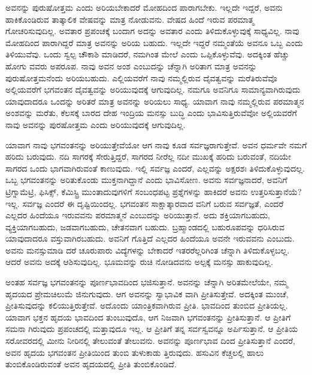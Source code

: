 ಅವನನ್ನು ಪುರುಷೋತ್ತಮ ಎಂದು ಅರಿಯಬೇಕಾದರೆ ಮೋಹದಿಂದ ಪಾರಾಗಬೇಕು. ಇಲ್ಲದೇ ಇದ್ದರೆ, ಅವನು ಹಾಕಿಕೊಂಡಿರುವ ತಾತ್ಕಾಲಿಕ ವೇಷವನ್ನು ಮಾತ್ರ ನೋಡುವನು. ವೇಷದ ಹಿಂದೆ ಇರುವ ಪರಮಾತ್ಮ ಗೋಚರಿಸುವುದಿಲ್ಲ. ಅವತಾರ ಪ್ರಪಂಚಕ್ಕೆ ಬಂದಾಗ ಅದನ್ನು ಅವತಾರ ಎಂದು ತಿಳಿದುಕೊಳ್ಳುವುಕ್ಕೆ ಸಾಧ್ಯವಿಲ್ಲ. ನಾವು ಮೋಹದಿಂದ ಪಾರಾಗಿದ್ದರೆ ಮಾತ್ರ ಅವನನ್ನು ಅರಿಯ ಬಹುದು. ಇಲ್ಲದೇ ಇದ್ದರೆ ನಮ್ಮಂತೆಯೆ ಅವನೂ ಒಬ್ಬ ಎಂದು ತಿಳಿಯುವೆವು. ಒಂದು ಸ್ವಲ್ಪ ಚೌಕಾಶಿ ಮಾಡಿದರೆ, ನಮಗಿಂತ ಮೇಲೆ ಎಂದು ಒಪ್ಪಿಕೊಳ್ಳುವೆವು. ಅದಕ್ಕಿಂತ ಹೆಚ್ಚು ಹೋಗು ವವರು ಅಪರೂಪ. ನಾವು ಅವನ ಅಂಶ ಎಂಬುದನ್ನು ಚೆನ್ನಾಗಿ ಅರಿತಾಗ ಮಾತ್ರ ಅವನನ್ನು ಪುರುಷೋತ್ತಮನೆಂದು ಅರಿಯಬಹುದು. ಎಲ್ಲಿಯವರೆಗೆ ನಾವು ನಮ್ಮಲ್ಲಿರುವ ದೈವತ್ವವನ್ನು ಮರೆತಿರುವೆವೊ ಅಲ್ಲಿಯವರೆಗೆ ಭಗವಂತನ ದೈವತ್ವವನ್ನು ಅರಿಯುವುದಕ್ಕೆ ಆಗುವುದಿಲ್ಲ. ನಮಗೂ ಅವನಿಗೂ ಸಾಮಾನ್ಯವಾಗಿರುವುದು ಯಾವುದಾದರೂ ಒಂದನ್ನು ಅರಿತರೆ ಮಾತ್ರ ಅವನನ್ನು ಅರಿಯಲು ಸಾಧ್ಯ. ಯಾವಾಗ ನಾವು ನಮ್ಮಲ್ಲಿರುವ ಪರಮಾತ್ಮನ ಅಂಶವನ್ನು ಮರೆತು, ಕೆಲಸಕ್ಕೆ ಬಾರದ ದೇಹ ಇಂದ್ರಿಯ ಮನಸ್ಸು ಬುದ್ಧಿ ಎಂದು ಭಾವಿಸುತ್ತಿರುವೆವೋ ಅಲ್ಲಿಯವರೆಗೆ ನಾವು ಅವನನ್ನು ಪುರಷೋತ್ತಮ ಎಂದು ಅರಿಯುವುದಕ್ಕೆ ಆಗುವುದಿಲ್ಲ.

ಯಾವಾಗ ನಾವು ಭಗವಂತನನ್ನು ಅರಿಯುತ್ತೇವೆಯೋ ಆಗ ನಾವು ಕೂಡ ಸರ್ವಜ್ಞರಾಗುತ್ತೇವೆ. ಅವನ ಧರ್ಮವೇ ನಮಗೆ ಹರಿದು ಬರುವುದು. ನದಿ ಸಾಗರಕ್ಕೆ ಸೇರುತ್ತಿದ್ದರೆ, ಸಾಗರದ ನೀರೆಲ್ಲ ನದೀ ಮುಖಕ್ಕೆ ಹರಿದು ಬರುವಂತೆ, ನದಿಯೇ ಸಾಗರದ ಒಂದು ಭಾಗವಾಗಿರುವಂತೆ ಕಾಣುವುದು. ಇಲ್ಲಿ ಸರ್ವಜ್ಞ ಎಂದರೆ, ಎಲ್ಲವನ್ನು ಅಕ್ಷರಶಃ ತಿಳಿದುಕೊಳ್ಳುವುದಲ್ಲ. ಒಬ್ಬ ಭಗವಂತನನ್ನು ಅರಿತುಕೊಂಡು ಮುಕ್ತನಾಗಿದ್ದಾನೆ ಎಂದು ಭಾವಿಸೋಣ. ಅವನು ಸರ್ವಜ್ಞನಾದರೆ, ಅವನಿಗೆ ಟ್ರಿಗ್ನಾಮೆಟ್ರಿ, ಫಿಸಿಕ್ಸ್, ಕೆಮಿಸ್ಟ್ರಿ ಮುಂತಾದುವುಗಳಿಗೆ ಸಂಬಂಧಪಟ್ಟ ಪ್ರಶ್ನೆಗಳನ್ನು ಹಾಕಿದರೆ ಅವನು ಉತ್ತರಿಸುತ್ತಾನೆಯೆ? ಇಲ್ಲ. ಸರ್ವಜ್ಞ ಎಂದರೆ ಈ ದೃಷ್ಟಿಯಿಂದಲ್ಲ. ಭಗವಂತನ ಸಾಕ್ಷಾತ್ಕಾರವಾದ ವನಿಗೆ ಬರುವ ಸರ್ವಜ್ಞತೆ, ಎಂದರೆ ಎಲ್ಲದರ ಹಿಂದೆಯೂ ಇರುವವನು ಪರಮಾತ್ಮನೆ ಎಂಬುದನ್ನು ಅರಿಯುತ್ತಾನೆ. ಅದು ಶಕ್ತಿಯಾಗಬಹುದು, ವ್ಯಕ್ತಿಯಾಗಬಹುದು, ಜಡವಾಗಬಹುದು, ಚೇತನವಾಗ ಬಹುದು. ಬ್ರಹ್ಮಾಂಡದಲ್ಲಿ ಬಹುರೂಪವನ್ನು ಧರಿಸಿರುವ ಯಾವುದಾದರೂ ವಸ್ತುವಾಗಿರಬಹುದು. ಅವನಿಗೆ ಗೊತ್ತಿದೆ ಎಲ್ಲದರ ಹಿಂದೆಯೂ ಅವನೇ ಇರುವವನು ಎಂಬುದು. ಅವನು ಮನಸ್ಸುಮಾಡಿ ದರೆ ಚೂರುಪಾರು ವಿದ್ಯೆಗಳನ್ನು ಬೇಕಾದರೆ ಇತರರೆಲ್ಲರಿಗಿಂತ ಚೆನ್ನಾಗಿ ತಿಳಿದುಕೊಳ್ಳಬಲ್ಲ. ಆದರೆ ಅವನು ಅದಕ್ಕೆ ಆಶಿಸುವುದಿಲ್ಲ. ಭೂಮವನ್ನು ರುಚಿ ನೋಡಿದವನು ಅಲ್ಪಕ್ಕೆ ಮನಸ್ಸು ಹಾಕುವುದಿಲ್ಲ.

ಅಂತಹ ಸರ್ವಜ್ಞ ಭಗವಂತನನ್ನು ಪೂರ್ಣಭಾವದಿಂದ ಭಜಿಸುತ್ತಾನೆ. ಅವನನ್ನು ಚೆನ್ನಾಗಿ ಅರಿತಮೇಲೆಯೇ, ನಮ್ಮ ಹೃದಯದ ಪ್ರೇಮಚಿಲುಮೆ ಜಿನುಗುವುದು. ಆಗ ಅವನನ್ನು ಸ್ವಾಭಾವಿಕ ವಾಗಿ ಪ್ರೀತಿಸುತ್ತೇವೆ. ಅದಕ್ಕಿಂತ ಮುಂಚೆ, ಪ್ರೀತಿಸುವುದನ್ನು ಕಲಿಯುತ್ತಿರುತ್ತೇವೆ. ಅದೊಂದು ಯಾಂತ್ರಿಕವಾಗಿರುವ ಪ್ರೀತಿ. ಭಾವದಿಂದ ತುಂಬಿದ ಪ್ರೀತಿಯಲ್ಲ. ಯಾವಾಗ ಭಕ್ತನ ಹೃದಯ ಭಾವದಿಂದ ತುಂಬುವುದೊ, ಆಗ ನಿಜವಾಗಿ ಭಗವಂತನನ್ನು ಪ್ರೀತಿಸುತ್ತಾನೆ. ಆ ಪ್ರೀತಿಗೆ ಸಮನಾ ಗಿರುವುದು ಪ್ರಪಂಚದಲ್ಲಿ ಮತ್ತಾವುದೂ ಇಲ್ಲ. ಆ ಪ್ರೀತಿಗೆ ತನ್ನ ಸರ್ವಸ್ವವನ್ನೂ ಅರ್ಪಿಸುತ್ತಾನೆ. ಆ ಪ್ರೀತಿಯ ಸರೋವರದಲ್ಲಿ ಮೀನು ನೀರಿನಲ್ಲಿ ತೇಲುವಂತೆ ತೇಲುವನು. ಅವನನ್ನು ಪೂರ್ಣಭಾವ ದಿಂದ ಪ್ರೀತಿಸುತ್ತಾನೆ ಎಂದರೆ, ಅವನ ಹೃದಯ ಭಗವಂತನ ಪ್ರೀತಿಯಿಂದ ತುಂಬಿ ತುಳುಕಾಡು ತ್ತಿರುವುದು. ಹಸುವಿನ ಕೆಚ್ಚಲಲ್ಲಿ ಹಾಲು ತುಂಬಿಕೊಂಡಿರುವಂತೆ ಅವನ ಹೃದಯದಲ್ಲಿ ಪ್ರೀತಿ ತುಂಬಿಕೊಂಡಿದೆ.

